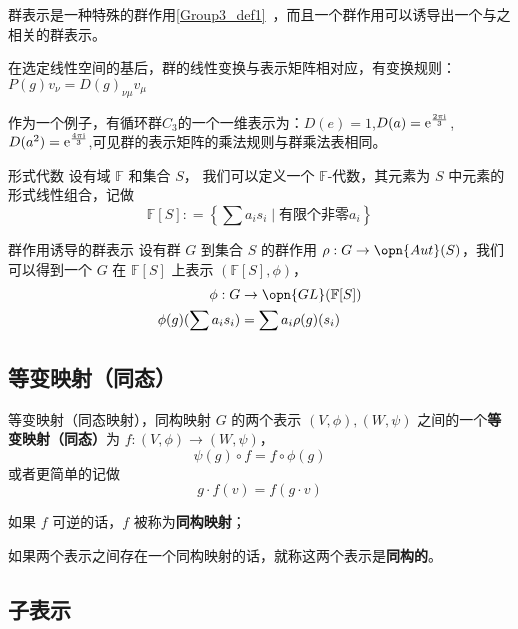群表示是一种特殊的群作用\autoref{Group3_def1}~，而且一个群作用可以诱导出一个与之相关的群表示。

在选定线性空间的基后，群的线性变换与表示矩阵相对应，有变换规则：$P(g)v_\nu=D(g)_{\nu\mu}v_\mu$

作为一个例子，有循环群$C_3$的一个一维表示为：$D(e)=1$,$D(a)=\rm{e}^{\frac{2\pi i}{3}}$,$D(a^2)=\rm{e}^{\frac{4\pi i}{3}}$,可见群的表示矩阵的乘法规则与群乘法表相同。


\begin{definition}{形式代数}
设有域 $\mathbb{F}$ 和集合 $S$， 我们可以定义一个 $\mathbb{F}$-代数，其元素为 $S$ 中元素的形式线性组合，记做
$$
\mathbb{F}[S]: = \left\{ \sum a_i s_i \mid \text{有限个非零} a_i \right\}
$$
\end{definition}

\begin{definition}{群作用诱导的群表示}
设有群 $G$ 到集合 $S$ 的群作用 $\rho: G \to \opn{Aut}(S)$，我们可以得到一个 $G$ 在 $\mathbb{F}[S]$ 上表示 $(\mathbb{F}[S], \phi)$，
$$\begin{aligned}
\phi: G &\to \opn{GL}(\mathbb{F}[S]) \\
\phi(g)(\sum a_i s_i) &= \sum a_i \rho(g)(s_i)
\end{aligned}$$
\end{definition}

\subsection{等变映射（同态）}

\begin{definition}{等变映射（同态映射），同构映射}
$G$ 的两个表示 $(V, \phi), (W, \psi)$ 之间的一个\textbf{等变映射（同态）}为 $f: (V, \phi) \to (W, \psi)$，
$$
\psi(g) \circ f = f \circ \phi(g)
$$
或者更简单的记做
$$
g \cdot f(v) = f(g \cdot v)
$$

如果 $f$ 可逆的话，$f$ 被称为\textbf{同构映射}；

如果两个表示之间存在一个同构映射的话，就称这两个表示是\textbf{同构的}。
\end{definition}


\subsection{子表示}


